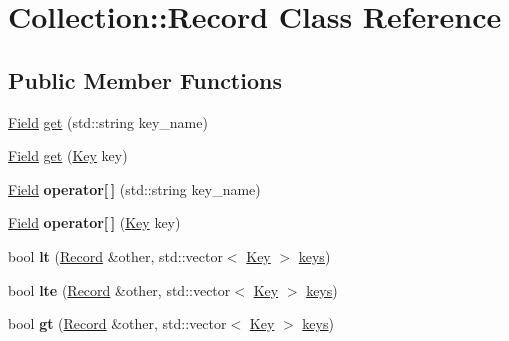 \hypertarget{class_collection_1_1_record}{}\section{Collection\+:\+:Record Class Reference}
\label{class_collection_1_1_record}
\subsection*{Public Member Functions}
\begin{DoxyCompactItemize}
\item 
\hyperlink{struct_field}{Field} \hyperlink{class_collection_1_1_record_ac045539ed42788b33b56c0c60b4bede4}{get} (std\+::string key\+\_\+name)
\item 
\hyperlink{struct_field}{Field} \hyperlink{class_collection_1_1_record_a7e977898edd578a4dd198798e77c96c7}{get} (\hyperlink{struct_key}{Key} key)
\item 
\mbox{\label{class_collection_1_1_record_a74ccccdc99f2a9bd9ee79d7b24b12637}} 
\hyperlink{struct_field}{Field} {\bfseries operator\mbox{[}$\,$\mbox{]}} (std\+::string key\+\_\+name)
\item 
\mbox{\label{class_collection_1_1_record_a1d1f629974dd996feddf5ddb9d15c689}} 
\hyperlink{struct_field}{Field} {\bfseries operator\mbox{[}$\,$\mbox{]}} (\hyperlink{struct_key}{Key} key)
\item 
\mbox{\label{class_collection_1_1_record_ae5891a93674f570c9b30e2d6eee381a8}} 
bool {\bfseries lt} (\hyperlink{class_collection_1_1_record}{Record} \&other, std\+::vector$<$ \hyperlink{struct_key}{Key} $>$ \hyperlink{class_collection_aebff0d78673dac8453ebf51ba32d10eb}{keys})
\item 
\mbox{\label{class_collection_1_1_record_a5f1321a0fd4f5ef2570917d2c3407a90}} 
bool {\bfseries lte} (\hyperlink{class_collection_1_1_record}{Record} \&other, std\+::vector$<$ \hyperlink{struct_key}{Key} $>$ \hyperlink{class_collection_aebff0d78673dac8453ebf51ba32d10eb}{keys})
\item 
\mbox{\label{class_collection_1_1_record_ad9f0b6f2e1bb15e922d54280eaad85bf}} 
bool {\bfseries gt} (\hyperlink{class_collection_1_1_record}{Record} \&other, std\+::vector$<$ \hyperlink{struct_key}{Key} $>$ \hyperlink{class_collection_aebff0d78673dac8453ebf51ba32d10eb}{keys})

\end{DoxyCompactItemize}
